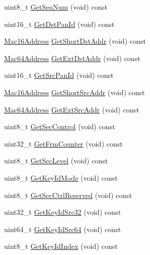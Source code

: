 \begin{DoxyCompactItemize}
uint8\+\_\+t \hyperlink{classns3_1_1LrWpanMacHeader_af28fab1c806434e0a677982507eab69d}{Get\+Seq\+Num} (void) const 
\item 
uint16\+\_\+t \hyperlink{classns3_1_1LrWpanMacHeader_a0a315dd05f63b5d640a854b6378c34f4}{Get\+Dst\+Pan\+Id} (void) const 
\item 
\hyperlink{classns3_1_1Mac16Address}{Mac16\+Address} \hyperlink{classns3_1_1LrWpanMacHeader_ad11fd3c37b7d1622243ccd66c1dd690d}{Get\+Short\+Dst\+Addr} (void) const 
\item 
\hyperlink{classns3_1_1Mac64Address}{Mac64\+Address} \hyperlink{classns3_1_1LrWpanMacHeader_a5489b85d8fd900a69e02e8aaaeb327fd}{Get\+Ext\+Dst\+Addr} (void) const 
\item 
uint16\+\_\+t \hyperlink{classns3_1_1LrWpanMacHeader_ade0bb459db99b55b5833cab0532b047b}{Get\+Src\+Pan\+Id} (void) const 
\item 
\hyperlink{classns3_1_1Mac16Address}{Mac16\+Address} \hyperlink{classns3_1_1LrWpanMacHeader_ab9e4b3858fbc55ca896f9789473f6a1a}{Get\+Short\+Src\+Addr} (void) const 
\item 
\hyperlink{classns3_1_1Mac64Address}{Mac64\+Address} \hyperlink{classns3_1_1LrWpanMacHeader_aaea723f0342521a835f1dc5198a4d12d}{Get\+Ext\+Src\+Addr} (void) const 
\item 
uint8\+\_\+t \hyperlink{classns3_1_1LrWpanMacHeader_a40ef259f098e2f1f8bd4e87a599f0715}{Get\+Sec\+Control} (void) const 
\item 
uint32\+\_\+t \hyperlink{classns3_1_1LrWpanMacHeader_acec1aee19e0a4b8c61f5be8643354c9d}{Get\+Frm\+Counter} (void) const 
\item 
uint8\+\_\+t \hyperlink{classns3_1_1LrWpanMacHeader_a73f945c1d240be2a90fc7284c3b492d1}{Get\+Sec\+Level} (void) const 
\item 
uint8\+\_\+t \hyperlink{classns3_1_1LrWpanMacHeader_a531a6e9795e874ecfea52e61f5a4b7a5}{Get\+Key\+Id\+Mode} (void) const 
\item 
uint8\+\_\+t \hyperlink{classns3_1_1LrWpanMacHeader_ad9fb19f33133156a67428d93db45e838}{Get\+Sec\+Ctrl\+Reserved} (void) const 
\item 
uint32\+\_\+t \hyperlink{classns3_1_1LrWpanMacHeader_a9badbd471387d840c94936701c2b468e}{Get\+Key\+Id\+Src32} (void) const 
\item 
uint64\+\_\+t \hyperlink{classns3_1_1LrWpanMacHeader_a4ed4534bed18469345524313e5d162a1}{Get\+Key\+Id\+Src64} (void) const 
\item 
uint8\+\_\+t \hyperlink{classns3_1_1LrWpanMacHeader_ade60365d0fe7bc56d283513990df5ccc}{Get\+Key\+Id\+Index} (void) const 

\end{DoxyCompactItemize}
